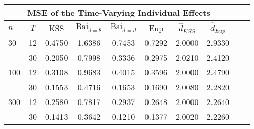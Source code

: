 \begin{tabular}{lccccccccc} 
\hline \multicolumn{8}{c}{MSE of the Time-Varying Individual Effects} \\ \hline 
$n$ & $T$ & KSS & $ \text{Bai}_{\hat{d} = 8}$ & $\text{Bai}_{\hat{d} = d}$ & Eup & $\hat{d}_{KSS}$ & $\hat{d}_{Eup}$ \\
\hline
30 & 12 &  0.4750  &  1.6386  &  0.7453  &  0.7292  &  2.0000  &  2.9330  \\
& 30 &  0.2050  &  0.7998  &  0.3336  &  0.2975  &  2.0210  &  2.4120  \\
100 & 12 &  0.3108  &  0.9683  &  0.4015  &  0.3596  &  2.0000  &  2.4790  \\
& 30 &  0.1553  &  0.4716  &  0.1653  &  0.1690  &  2.0080  &  2.2820  \\
300 & 12 &  0.2580  &  0.7817  &  0.2937  &  0.2648  &  2.0000  &  2.2640  \\
& 30 &  0.1413  &  0.3642  &  0.1210  &  0.1377  &  2.0020  &  2.2260  \\
\end{tabular} 
